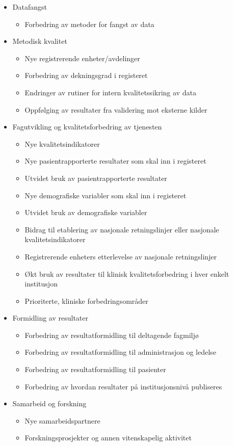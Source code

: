 \documentclass[norsk, a4paper, twocolumn]{report}
\begin{document}
\begin{itemize}
  \item Datafangst
    \begin{itemize}
      \item Forbedring av metoder for fangst av data
    \end{itemize}
  \item Metodisk kvalitet
    \begin{itemize}
      \item Nye registrerende enheter/avdelinger
      \item Forbedring av dekningsgrad i registeret
      \item Endringer av rutiner for intern kvalitetssikring av data
      \item Oppfølging av resultater fra validering mot eksterne kilder
    \end{itemize}
  \item Fagutvikling og kvalitetsforbedring av tjenesten
    \begin{itemize}
      \item Nye kvalitetsindikatorer
      \item Nye pasientrapporterte resultater som skal inn i registeret
      \item Utvidet bruk av pasientrapporterte resultater
      \item Nye demografiske variabler som skal inn i registeret
      \item Utvidet bruk av demografiske variabler
      \item Bidrag til etablering av nasjonale retningslinjer eller 
        nasjonale kvalitetsindikatorer
      \item Registrerende enheters etterlevelse av nasjonale retningslinjer
      \item Økt bruk av resultater til klinisk kvalitetsforbedring i hver
        enkelt institusjon
      \item Prioriterte, kliniske forbedringsområder
    \end{itemize}
  \item Formidling av resultater
    \begin{itemize}
      \item Forbedring av resultatformidling til deltagende fagmiljø
      \item Forbedring av resultatformidling til administrasjon og ledelse
      \item Forbedring av resultatformidling til pasienter
      \item Forbedring av hvordan resultater på institusjonsnivå
        publiseres
    \end{itemize}
  \item Samarbeid og forskning
    \begin{itemize}
      \item Nye samarbeidspartnere
      \item Forskningsprosjekter og annen vitenskapelig aktivitet
    \end{itemize}
\end{itemize}
\end{document}

